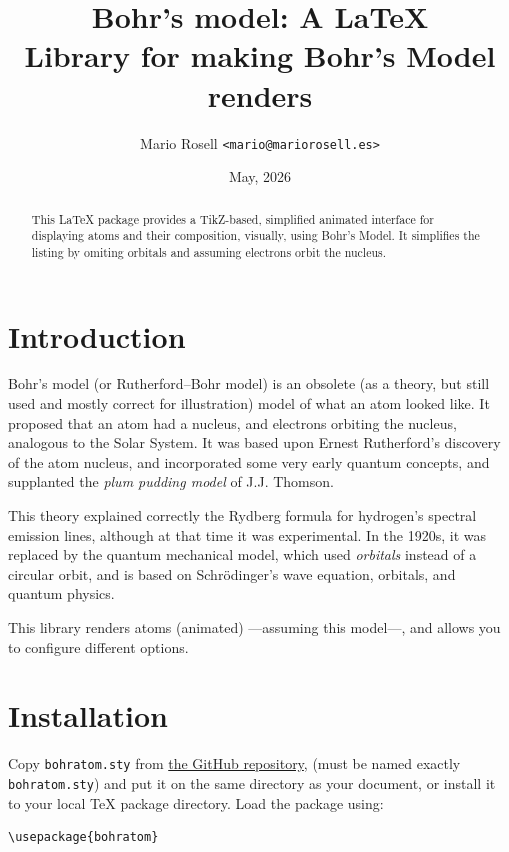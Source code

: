 \documentclass[
	a4paper,
	10pt,
]{article}
\title{Bohr's model: A \LaTeX\\ Library for making Bohr's Model renders}
\author{Mario Rosell \texttt{<mario@mariorosell.es>}}
\date{May, 2026}
\begin{document}
\maketitle

\begin{abstract}
	\noindent This \LaTeX{} package provides a TikZ-based, simplified animated interface for displaying atoms and their composition, visually, using Bohr's Model. It simplifies the listing by omiting orbitals and assuming electrons orbit the nucleus.
\end{abstract}

\section{Introduction}

Bohr's model (or Rutherford--Bohr model) is an obsolete (as a theory, but still used and mostly correct for illustration) model of what an atom looked like. It proposed that an atom had a nucleus, and electrons orbiting the nucleus, analogous to the Solar System. It was based upon Ernest Rutherford's discovery of the atom nucleus, and incorporated some very early quantum concepts, and supplanted the \textit{plum pudding model} of J.J. Thomson.

This theory explained correctly the Rydberg formula for hydrogen's spectral emission lines, although at that time it was experimental. In the 1920s, it was replaced by the quantum mechanical model, which used \textit{orbitals} instead of a circular orbit, and is based on Schr\"odinger's wave equation, orbitals, and quantum physics.

This library renders atoms (animated) ---assuming this model---, and allows you to configure different options.

\section{Installation}

Copy \texttt{bohratom.sty} from \href{https://raw.githubusercontent.com/cajald/bohratom/refs/heads/main/bohratom.sty}{the GitHub repository}, (must be named exactly \texttt{bohratom.sty}) and put it on the same directory as your document, or install it to your local \TeX{} package directory. Load the package using:

\begin{verbatim}
\usepackage{bohratom}
\end{verbatim}
\end{document}
